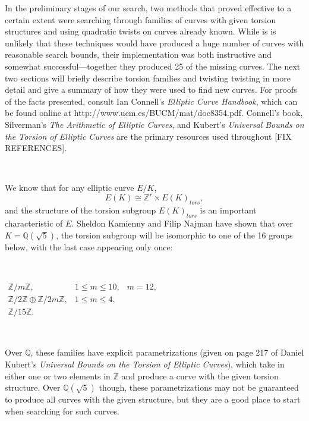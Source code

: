 In the preliminary stages of our search, two methods that proved effective to a certain extent were searching through families of curves with given torsion structures and using quadratic twists on curves already known. While is is unlikely that these techniques would have produced a huge number of curves with reasonable search bounds, their implementation was both instructive and somewhat successful---together they produced 25 of the missing curves. The next two sections will briefly describe torsion families and twisting twisting in more detail and give a summary of how they were used to find new curves. For proofs of the facts presented, consult Ian Connell's \emph{Elliptic Curve Handbook}, which can be found online at  http://www.ucm.es/BUCM/mat/doc8354.pdf. Connell's book, Silverman's \emph{The Arithmetic of Elliptic Curves}, and Kubert's \emph{Universal Bounds on the Torsion of Elliptic Curves} are the primary resources used throughout [FIX REFERENCES].

\

We know that for any elliptic curve $E/K$,
\begin{equation}
E(K) \cong \mathbb{Z}^r \times E(K)_{tors}, \nonumber
\end{equation}
and the structure of the torsion subgroup $E(K)_{tors}$ is an important characteristic of $E$. Sheldon Kamienny and Filip Najman have shown that over $K = \mathbb{Q}(\sqrt{5})$, the torsion subgroup will be isomorphic to one of the 16 groups below, with the last case appearing only once:

\

$\begin{array}{lll}
\mathbb{Z}/m\mathbb{Z},   &1 \leq m \leq 10,& m = 12,\\
\mathbb{Z}/2\mathbb{Z} \oplus \mathbb{Z}/2m\mathbb{Z}, &  1 \leq m \leq 4,&\\
\mathbb{Z}/15\mathbb{Z}.&&
\end{array}$

\

Over $\mathbb{Q}$, these families have explicit parametrizations (given on page 217 of Daniel Kubert's \emph{Universal Bounds on the Torsion of Elliptic Curves}), which take in either one or two elements in $\mathbb{Z}$ and produce a curve with the given torsion structure. Over $\mathbb{Q}(\sqrt{5})$ though, these parametrizations may not be guaranteed to produce all curves with the given structure, but they are a good place to start when searching for such curves.


